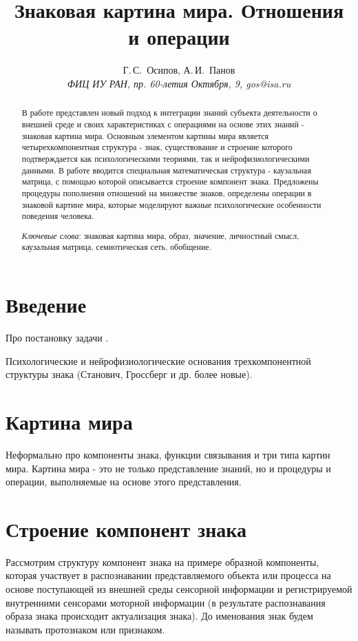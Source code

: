 \documentclass[12pt]{scrartcl}
\title{Знаковая картина мира. Отношения и операции}
\author{Г.\,С.~Осипов, А.\,И.~Панов\\
	{\large\slshape ФИЦ ИУ РАН, пр. 60-летия Октября, 9, gos@isa.ru}}
\begin{document}
	
	\maketitle{}
	\begin{abstract}
		В работе представлен новый подход к интеграции знаний субъекта деятельности о внешней среде и своих характеристиках с операциями на основе этих знаний - знаковая картина мира. Основным элементом картины мира является четырехкомпонентная структура - знак, существование и строение которого подтверждается как психологическими теориями, так и нейрофизиологическими данными. В работе вводится специальная математическая структура - каузальная матрица, с помощью которой описывается строение компонент знака. Предложены процедуры пополнения отношений на множестве знаков, определены операции в знаковой картине мира, которые моделируют важные психологические особенности поведения человека.
		\par\bigskip
		\textit{Ключевые слова}: знаковая картина мира, образ, значение, личностный смысл, каузальная матрица, семиотическая сеть, обобщение.
	\end{abstract}
	
	
	\section*{Введение}
	Про постановку задачи \cite{Osipov2014c,Osipov2015d}.
	
	Психологические и нейрофизиологические основания трехкомпонентной структуры знака (Станович, Гроссберг и др. более новые).
	
	\section{Картина мира}

	Неформально про компоненты знака, функции связывания и три типа картин мира. Картина мира - это не только представление знаний, но и процедуры и операции, выполняемые на основе этого представления.
	
	\section{Строение компонент знака}
	
	Рассмотрим структуру компонент знака на примере образной компоненты, которая участвует в распознавании представляемого объекта или процесса на основе поступающей из внешней среды сенсорной информации и регистрируемой внутренними сенсорами моторной информации (в результате распознавания образа знака происходит актуализация знака). До именования знак будем называть протознаком или признаком.
	
\end{document}

